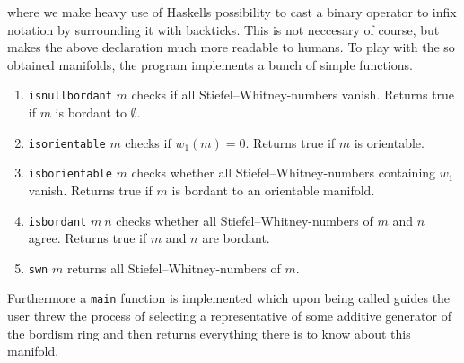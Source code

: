 where we make heavy use of Haskells possibility to cast a binary operator to infix notation by surrounding it with backticks.
This is not neccesary of course, but makes the above declaration much more readable to humans.
To play with the so obtained manifolds, the program implements a bunch of simple functions.
\begin{enumerate}[noitemsep,label=$\rightarrow$]
    \item \texttt{isnullbordant} $m$ checks if all Stiefel--Whitney-numbers vanish. Returns true if $m$ is bordant to $\emptyset$.
    \item \texttt{isorientable} $m$ checks if $w_1(m) = 0$. Returns true if $m$ is orientable.
    \item \texttt{isborientable} $m$ checks whether all Stiefel--Whitney-numbers containing $w_1$ vanish. Returns true if $m$ is bordant to an orientable manifold.
    \item \texttt{isbordant} $m\: n$ checks whether all Stiefel--Whitney-numbers of $m$ and $n$ agree. Returns true if $m$ and $n$ are bordant.
    \item \texttt{swn} $m$ returns all Stiefel--Whitney-numbers of $m$.
\end{enumerate}
Furthermore a \texttt{main} function is implemented which upon being called guides the user threw the process of selecting a representative of some additive generator of the bordism ring and then returns everything there is to know about this manifold.

